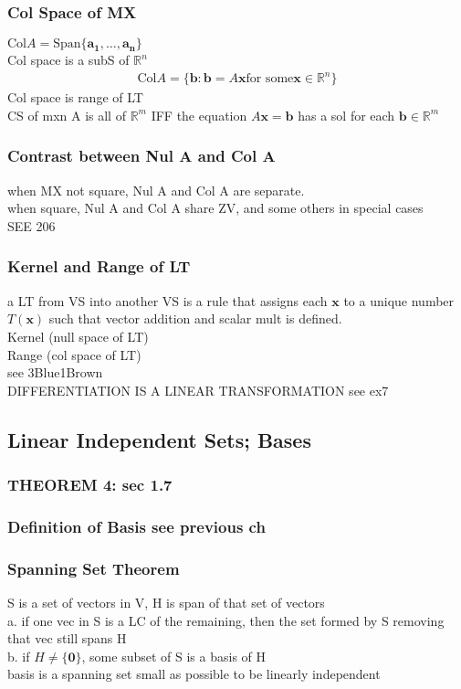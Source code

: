 \documentclass[12pt]{article}
\newcommand{\R}{\mathbb{R}}
\begin{document}
    \subsubsection{Col Space of MX}
    $\text{Col} A = \text{Span}\{\bm{a_{1}},\dots ,\bm{a_{n}}\}$ \\
        Col space is a subS of $\R^n$
        \begin{align*}
            \text{Col} A = \{\bm{b}:\bm{b} = A\bm{x} \text{for some}\bm{x}
            \in\R^n\}
        \end{align*}
        Col space is range of LT\\
        CS of mxn A is all of $\R^m$  IFF the equation
        $A\bm{x} = \bm{b}$  has a sol for each $\bm{b}\in\R^m$ 
    \subsubsection{Contrast between Nul A and Col A}
        when MX not square, Nul A and Col A are separate.\\
        when square, Nul A and Col A share ZV, and some others in special cases\\
        SEE 206 
    \subsubsection{Kernel and Range of LT}
        a LT from VS into another VS is a rule that assigns 
        each $\bm{x}$  to a unique number $T(\bm{x})$ such that
        vector addition and scalar mult is defined.\\
        Kernel (null space of LT) \\
        Range (col space of LT) \\
        see 3Blue1Brown \\
        DIFFERENTIATION IS A LINEAR TRANSFORMATION see ex7 
\subsection{Linear Independent Sets; Bases}
    \subsubsection{THEOREM 4: sec 1.7}
    \subsubsection{Definition of Basis see previous ch}
    \subsubsection{Spanning Set Theorem}
        S is a set of vectors in V, H is span of that set of vectors \\
        a. if one vec in S is a LC of the remaining, then the set
        formed by S removing that vec still spans H \\
        b. if $H\ne \{\bm{0}\}$, some subset of S is a basis of H \\
        basis is a spanning set small as possible to be linearly independent
\end{document}
